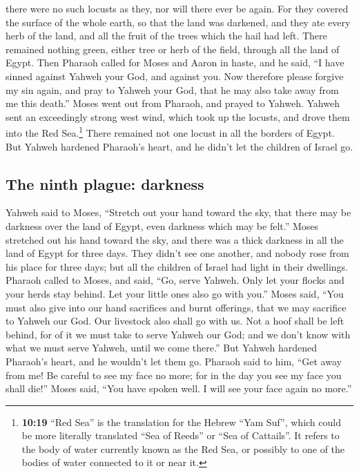 there were no such locusts as they, nor will there ever be again.
 For they covered the surface of the whole earth, so that
the land was darkened, and they ate every herb of the land, and all the
fruit of the trees which the hail had left. There remained nothing
green, either tree or herb of the field, through all the land of Egypt.
 Then Pharaoh called for Moses and Aaron in haste, and he
said, ``I have sinned against Yahweh your God, and against you.
 Now therefore please forgive my sin again, and pray to
Yahweh your God, that he may also take away from me this death.''
 Moses went out from Pharaoh, and prayed to Yahweh.
 Yahweh sent an exceedingly strong west wind, which took
up the locusts, and drove them into the Red Sea.\footnote{\textbf{10:19}
  ``Red Sea'' is the translation for the Hebrew ``Yam Suf'', which could
  be more literally translated ``Sea of Reeds'' or ``Sea of Cattails''.
  It refers to the body of water currently known as the Red Sea, or
  possibly to one of the bodies of water connected to it or near it.}
There remained not one locust in all the borders of Egypt.
 But Yahweh hardened Pharaoh's heart, and he didn't let
the children of Israel go.

\hypertarget{the-ninth-plague-darkness}{%
\subsection{The ninth plague:
darkness}\label{the-ninth-plague-darkness}}

 Yahweh said to Moses, ``Stretch out your hand toward the
sky, that there may be darkness over the land of Egypt, even darkness
which may be felt.''  Moses stretched out his hand toward
the sky, and there was a thick darkness in all the land of Egypt for
three days.  They didn't see one another, and nobody rose
from his place for three days; but all the children of Israel had light
in their dwellings.  Pharaoh called to Moses, and said,
``Go, serve Yahweh. Only let your flocks and your herds stay behind. Let
your little ones also go with you.''  Moses said, ``You
must also give into our hand sacrifices and burnt offerings, that we may
sacrifice to Yahweh our God.  Our livestock also shall go
with us. Not a hoof shall be left behind, for of it we must take to
serve Yahweh our God; and we don't know with what we must serve Yahweh,
until we come there.''  But Yahweh hardened Pharaoh's
heart, and he wouldn't let them go.  Pharaoh said to him,
``Get away from me! Be careful to see my face no more; for in the day
you see my face you shall die!''  Moses said, ``You have
spoken well. I will see your face again no more.''

